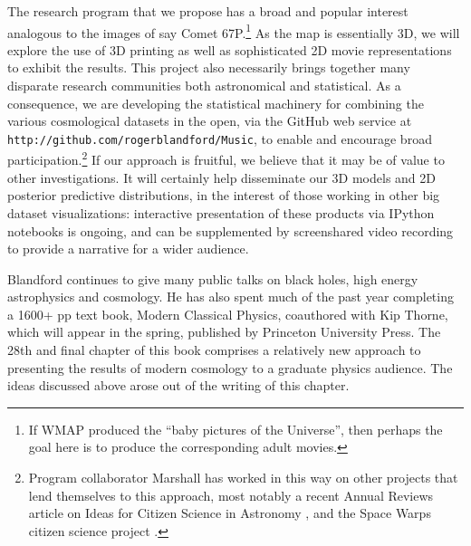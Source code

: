 \documentclass[psfig,12pt]{article}
\begin{document}
{The research program that we propose has a broad and popular interest
analogous to the images of say Comet 67P.\footnote{If WMAP produced the
``baby pictures of the Universe'', then perhaps the goal here is to
produce the corresponding adult movies.} As the map is essentially 3D,
we will explore the use of 3D printing as well as sophisticated 2D movie
representations to exhibit the results. This project also necessarily
brings together many disparate research communities both astronomical
and statistical. As a consequence, we are developing the statistical
machinery for combining the various cosmological datasets in the open,
via the GitHub web service at
\texttt{http://github.com/rogerblandford/Music}, to enable and encourage
broad participation.\footnote{Program collaborator Marshall has worked in this way on other
projects that lend themselves to this approach, most notably a recent
Annual Reviews article on Ideas for Citizen Science in Astronomy
\cite{CitSciReview}, and the Space Warps citizen science project
\cite{SpaceWarps}.}
If our approach is fruitful, we believe that it may be of value to other
investigations. It will certainly help disseminate our 3D models and 2D
posterior predictive distributions, in the interest of those working in
other big dataset visualizations: interactive presentation of these
products via IPython notebooks is ongoing, and can be supplemented by
screenshared video recording to provide a narrative for a wider
audience.

Blandford continues to give many public talks on black
holes, high energy astrophysics and cosmology. He has also spent much of
the past year completing a 1600+ pp text book, Modern Classical Physics,
coauthored with Kip Thorne, which will appear in the spring, published
by Princeton University Press. The 28th and final chapter of this book
comprises a relatively new approach to presenting the results of modern
cosmology to a graduate physics audience. The ideas discussed above
arose out of the writing of this chapter.


}
\end{document}
